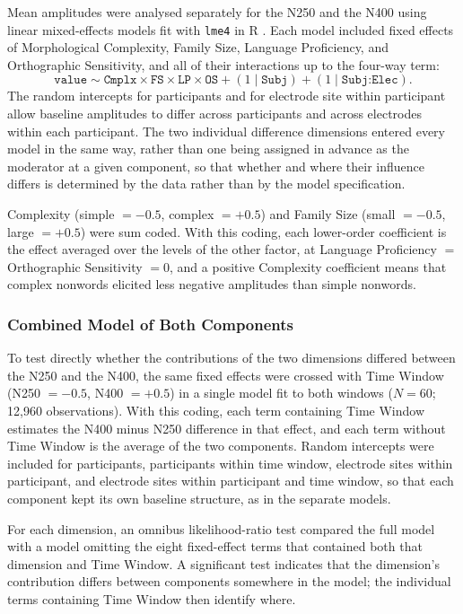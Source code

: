 Mean amplitudes were analysed separately for the N250 and the N400 using linear mixed-effects models fit with \texttt{lme4} \citep{batesFittingLinearMixedeffects2015} in R \citep{rcoreteamLanguageEnvironmentStatistical2026}. Each model included fixed effects of Morphological Complexity, Family Size, Language Proficiency, and Orthographic Sensitivity, and all of their interactions up to the four-way term:
\[
\texttt{value} \sim \texttt{Cmplx} \times \texttt{FS} \times \texttt{LP} \times \texttt{OS} + (1 \mid \texttt{Subj}) + (1 \mid \texttt{Subj:Elec}).
\]
The random intercepts for participants and for electrode site within participant allow baseline amplitudes to differ across participants and across electrodes within each participant. The two individual difference dimensions entered every model in the same way, rather than one being assigned in advance as the moderator at a given component, so that whether and where their influence differs is determined by the data rather than by the model specification.

Complexity (simple $= -0.5$, complex $= +0.5$) and Family Size (small $= -0.5$, large $= +0.5$) were sum coded. With this coding, each lower-order coefficient is the effect averaged over the levels of the other factor, at Language Proficiency $=$ Orthographic Sensitivity $= 0$, and a positive Complexity coefficient means that complex nonwords elicited less negative amplitudes than simple nonwords.

\subsubsection{Combined Model of Both Components}

To test directly whether the contributions of the two dimensions differed between the N250 and the N400, the same fixed effects were crossed with Time Window (N250 $= -0.5$, N400 $= +0.5$) in a single model fit to both windows ($N = 60$; 12,960 observations). With this coding, each term containing Time Window estimates the N400 minus N250 difference in that effect, and each term without Time Window is the average of the two components. Random intercepts were included for participants, participants within time window, electrode sites within participant, and electrode sites within participant and time window, so that each component kept its own baseline structure, as in the separate models.

For each dimension, an omnibus likelihood-ratio test compared the full model with a model omitting the eight fixed-effect terms that contained both that dimension and Time Window. A significant test indicates that the dimension's contribution differs between components somewhere in the model; the individual terms containing Time Window then identify where.

